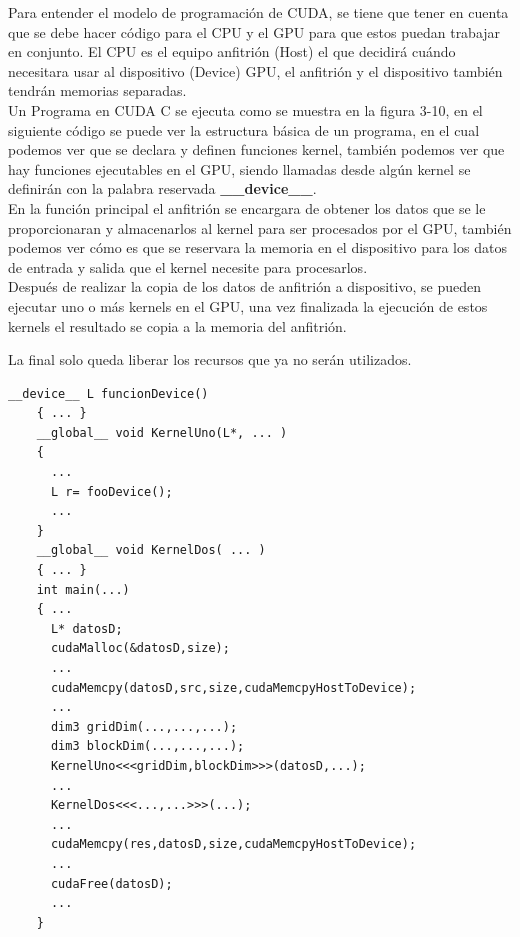 Para entender el modelo de programación de CUDA, se tiene que tener en cuenta que se debe hacer código para el CPU y el GPU para que estos puedan trabajar en conjunto. El CPU es el equipo anfitrión (Host) el que decidirá cuándo necesitara usar al dispositivo (Device) GPU, el anfitrión y el dispositivo también tendrán memorias separadas. 
\\
Un Programa en CUDA C se ejecuta como se muestra en la figura 3-10, en el siguiente código se puede ver la estructura básica de un programa, en el cual podemos ver que se declara y definen funciones kernel, también podemos ver que hay funciones ejecutables en el GPU, siendo llamadas desde algún kernel se definirán con la palabra reservada \textbf{\_\_device\_\_}.
\\
En la función principal el anfitrión se encargara de obtener los datos que se le proporcionaran y almacenarlos al kernel para ser procesados por el  GPU, también podemos ver cómo es que se reservara la memoria en el dispositivo para los datos de entrada y salida que el kernel necesite para procesarlos.
\\
Después de realizar la copia de los datos de anfitrión a dispositivo, se pueden ejecutar uno o más kernels en el GPU, una vez finalizada la ejecución de estos kernels el resultado se copia a la memoria del anfitrión. 
\pagebreak

La final solo queda liberar los recursos que ya no serán utilizados. 

\begin{lstlisting}[caption=Estructura general de un programa en CUDA C.]
	__device__ L funcionDevice()
	{ ... }	
	__global__ void KernelUno(L*, ... )
    {
      ...
   	  L r= fooDevice();
   	  ...
    }
    __global__ void KernelDos( ... )
    { ... }    
    int main(...)
	{ ...
	  L* datosD;
	  cudaMalloc(&datosD,size);
	  ...		
	  cudaMemcpy(datosD,src,size,cudaMemcpyHostToDevice);		
	  ...	
	  dim3 gridDim(...,...,...);
	  dim3 blockDim(...,...,...);
	  KernelUno<<<gridDim,blockDim>>>(datosD,...);	
	  ...
	  KernelDos<<<...,...>>>(...);
	  ...
	  cudaMemcpy(res,datosD,size,cudaMemcpyHostToDevice);
	  ...
	  cudaFree(datosD);
	  ...			
	}
\end{lstlisting}




  






